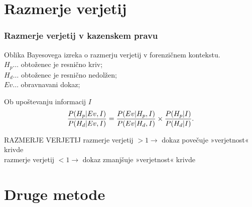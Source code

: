 \documentclass{beamer}
\begin{document}
\section{Razmerje verjetij}

\begin{frame}
   \frametitle{Razmerje verjetij v kazenskem pravu}
   Oblika Bayesovega izreka o razmerju verjetij v forenzičnem kontekstu.\\ \vspace{2mm}
   $H_p \dots$ obtoženec je resnično kriv;\\
   $H_d \dots$ obtoženec je resnično nedolžen;\\
   $Ev \dots$ obravnavani dokaz;\\ \vspace{2mm}
   \begin{block}{Ob upoštevanju informacij $I$}
       \[
           \frac{P(H_p \lvert Ev, I)}{P(H_d \lvert Ev, I)} = \frac{P(Ev \lvert H_p, I)}{P(Ev \lvert H_d, I)} \times \frac{P(H_p \lvert I)}{P(H_d \lvert I)}. \vspace{2mm}
       \]
   \end{block}
   \begin{block}{RAZMERJE VERJETIJ}
      razmerje verjetij $> 1 \rightarrow$  dokaz povečuje »verjetnost« krivde\\
      razmerje verjetij $< 1 \rightarrow$  dokaz zmanjšuje »verjetnost« krivde\\
   \end{block}
\end{frame}

\section{Druge metode}
\end{document}

